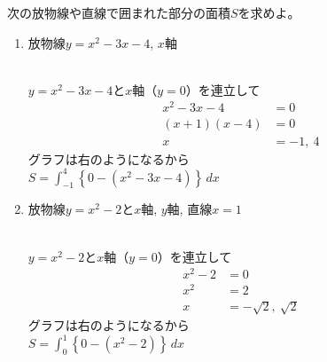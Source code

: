 \begin{multicols*}{4}
 次の放物線や直線で囲まれた部分の面積$S$を求めよ。
 \begin{enumerate}
  \item  放物線$y=x^2-3x-4$, $x$軸
	 \begin{ansBlockSize}{42}
	  \\
	  $y=x^2-3x-4$と$x$軸（$y=0$）を連立して
	  \begin{align*}
	   x^2-3x-4 &= 0\\
	   (x+1)(x-4) &= 0\\
	   x &= -1,\ 4
	  \end{align*}
	  グラフは右のようになるから\\
	  $S = \displaystyle\int_{-1}^{4}\left\{0-(x^2-3x-4)\right\}\,dx$
	 \end{ansBlockSize}
	 \vfill
  \item  放物線$y=x^2-2$と$x$軸, $y$軸, 直線$x=1$
	 \begin{ansBlockSize}{42}
	  \\
	  $y=x^2-2$と$x$軸（$y=0$）を連立して
	  \begin{align*}
	   x^2-2 &= 0\\
	   x^2 &= 2\\
	   x &= -\sqrt{2},\ \sqrt{2}
	  \end{align*}
	  グラフは右のようになるから\\
	  $S = \displaystyle\int_{0}^{1}\left\{0-(x^2-2)\right\}\,dx$
	 \end{ansBlockSize}
 \end{enumerate}
 
 \columnbreak{}
 \ReturnBox
 
\end{multicols*}


